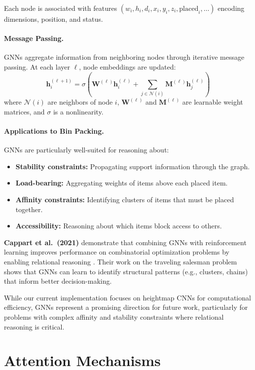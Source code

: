 Each node is associated with features $(w_i, h_i, d_i, x_i, y_i, z_i, \text{placed}_i, \ldots)$ encoding dimensions, position, and status.

\paragraph{Message Passing.}
GNNs aggregate information from neighboring nodes through iterative message passing. At each layer $\ell$, node embeddings are updated:
\[
\mathbf{h}_i^{(\ell+1)} = \sigma\left( \mathbf{W}^{(\ell)} \mathbf{h}_i^{(\ell)} + \sum_{j \in \mathcal{N}(i)} \mathbf{M}^{(\ell)} \mathbf{h}_j^{(\ell)} \right)
\]
where $\mathcal{N}(i)$ are neighbors of node $i$, $\mathbf{W}^{(\ell)}$ and $\mathbf{M}^{(\ell)}$ are learnable weight matrices, and $\sigma$ is a nonlinearity.

\paragraph{Applications to Bin Packing.}
GNNs are particularly well-suited for reasoning about:
\begin{itemize}
\item \textbf{Stability constraints:} Propagating support information through the graph.
\item \textbf{Load-bearing:} Aggregating weights of items above each placed item.
\item \textbf{Affinity constraints:} Identifying clusters of items that must be placed together.
\item \textbf{Accessibility:} Reasoning about which items block access to others.
\end{itemize}

\textbf{Cappart et al.\ (2021)} demonstrate that combining GNNs with reinforcement learning improves performance on combinatorial optimization problems by enabling relational reasoning \cite{CCBT21}. Their work on the traveling salesman problem shows that GNNs can learn to identify structural patterns (e.g., clusters, chains) that inform better decision-making.

While our current implementation focuses on heightmap CNNs for computational efficiency, GNNs represent a promising direction for future work, particularly for problems with complex affinity and stability constraints where relational reasoning is critical.

\section{Attention Mechanisms}
\label{sec:attention}

